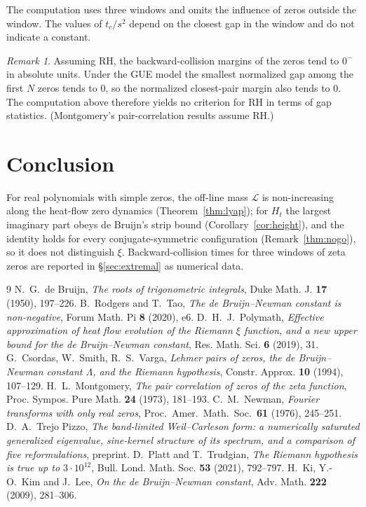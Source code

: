 \documentclass[11pt]{amsart}
\theoremstyle{definition}
\theoremstyle{remark}
\newtheorem{remark}[theorem]{Remark}
\newcommand{\Lyap}{\mathcal L}
\begin{document}
The computation uses three windows and omits the influence of zeros outside the window. The values of
$t_c/s^2$ depend on the closest gap in the window and do not indicate a constant.

\begin{remark}\label{obs:target}
Assuming RH, the backward-collision margins of the zeros tend to $0^-$ in absolute units. Under the GUE model
the smallest normalized gap among the first $N$ zeros tends to $0$, so the normalized closest-pair margin also
tends to $0$. The computation above therefore yields no criterion for RH in terms of gap statistics. (Montgomery's
pair-correlation results \cite{Mont} assume RH.)
\end{remark}

\section{Conclusion}\label{sec:concl}

For real polynomials with simple zeros, the off-line mass $\Lyap$ is non-increasing along the heat-flow zero
dynamics (Theorem~\ref{thm:lyap}); for $H_t$ the largest imaginary part obeys de Bruijn's strip bound
(Corollary~\ref{cor:height}), and the identity holds for every conjugate-symmetric configuration
(Remark~\ref{thm:nogo}), so it does not distinguish $\xi$. Backward-collision times for three windows of zeta
zeros are reported in \S\ref{sec:extremal} as numerical data.

\begin{thebibliography}{9}
 N.~G.~de Bruijn, \emph{The roots of trigonometric integrals}, Duke Math. J. \textbf{17} (1950), 197--226.
 B.~Rodgers and T.~Tao, \emph{The de Bruijn--Newman constant is non-negative}, Forum Math. Pi \textbf{8} (2020), e6.
 D.~H.~J.~Polymath, \emph{Effective approximation of heat flow evolution of the Riemann $\xi$ function, and a new upper bound for the de Bruijn--Newman constant}, Res. Math. Sci. \textbf{6} (2019), 31.
 G.~Csordas, W.~Smith, R.~S.~Varga, \emph{Lehmer pairs of zeros, the de Bruijn--Newman constant $\Lambda$, and the Riemann hypothesis}, Constr. Approx. \textbf{10} (1994), 107--129.
 H.~L.~Montgomery, \emph{The pair correlation of zeros of the zeta function}, Proc. Sympos. Pure Math. \textbf{24} (1973), 181--193.
 C.~M.~Newman, \emph{Fourier transforms with only real zeros}, Proc.\ Amer.\ Math.\ Soc.\ \textbf{61} (1976), 245--251.
 D.~A.~Trejo Pizzo, \emph{The band-limited Weil--Carleson form: a numerically saturated generalized eigenvalue, sine-kernel structure of its spectrum, and a comparison of five reformulations}, preprint.
 D.~Platt and T.~Trudgian, \emph{The Riemann hypothesis is true up to $3\cdot10^{12}$}, Bull. Lond. Math. Soc. \textbf{53} (2021), 792--797.
 H.~Ki, Y.-O.~Kim and J.~Lee, \emph{On the de Bruijn--Newman constant}, Adv. Math. \textbf{222} (2009), 281--306.
\end{thebibliography}
\end{document}
